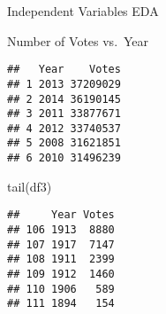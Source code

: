 \documentclass[
  ignorenonframetext,
]{beamer}
\newenvironment{Shaded}{\begin{snugshade}}{\end{snugshade}}
\newcommand{\AttributeTok}[1]{\textcolor[rgb]{0.77,0.63,0.00}{#1}}
\newcommand{\CommentTok}[1]{\textcolor[rgb]{0.56,0.35,0.01}{\textit{#1}}}
\newcommand{\FunctionTok}[1]{\textcolor[rgb]{0.00,0.00,0.00}{#1}}
\newcommand{\NormalTok}[1]{#1}
\newcommand{\OtherTok}[1]{\textcolor[rgb]{0.56,0.35,0.01}{#1}}
\newcommand{\SpecialCharTok}[1]{\textcolor[rgb]{0.00,0.00,0.00}{#1}}
\newcommand{\StringTok}[1]{\textcolor[rgb]{0.31,0.60,0.02}{#1}}
\begin{document}
\begin{frame}[fragile]{Independent Variables EDA}
\begin{block}{Number of Votes vs.~Year}
\protect\hypertarget{number-of-votes-vs.-year}{}
\begin{Shaded}
\end{Shaded}

\begin{verbatim}
##   Year    Votes
## 1 2013 37209029
## 2 2014 36190145
## 3 2011 33877671
## 4 2012 33740537
## 5 2008 31621851
## 6 2010 31496239
\end{verbatim}

\begin{Shaded}
\begin{Highlighting}[]
\FunctionTok{tail}\NormalTok{(df3)}
\end{Highlighting}
\end{Shaded}

\begin{verbatim}
##     Year Votes
## 106 1913  8880
## 107 1917  7147
## 108 1911  2399
## 109 1912  1460
## 110 1906   589
## 111 1894   154
\end{verbatim}


\end{block}
\end{frame}
\end{document}
